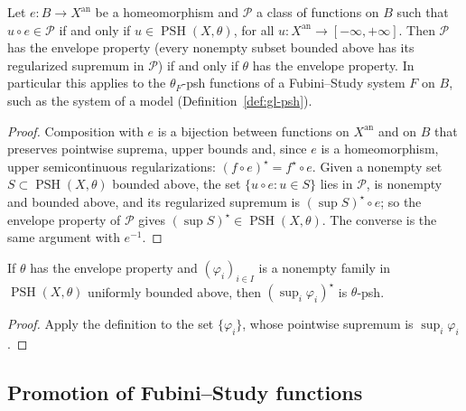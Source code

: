 \begin{lemma}
\label{lem:var-ep-transport}
\leanok
{}
Let $e:B\to X^{\mathrm{an}}$ be a homeomorphism and $\mathcal P$ a class of functions on $B$
such that $u\circ e\in\mathcal P$ if and only if $u\in\operatorname{PSH}(X,\theta)$, for all
$u:X^{\mathrm{an}}\to[-\infty,+\infty]$. Then $\mathcal P$ has the envelope property (every
nonempty subset bounded above has its regularized supremum in $\mathcal P$) if and only if
$\theta$ has the envelope property. In particular this applies to the $\theta_F$-psh functions
of a Fubini--Study system $F$ on $B$, such as the system of a model
(Definition~\ref{def:gl-psh}).
\end{lemma}
\begin{proof}
Composition with $e$ is a bijection between functions on $X^{\mathrm{an}}$ and on $B$ that
preserves pointwise suprema, upper bounds and, since $e$ is a homeomorphism, upper
semicontinuous regularizations: $(f\circ e)^\star=f^\star\circ e$. Given a nonempty set
$S\subset\operatorname{PSH}(X,\theta)$ bounded above, the set $\{u\circ e:u\in S\}$ lies in
$\mathcal P$, is nonempty and bounded above, and its regularized supremum is
$(\sup S)^\star\circ e$; so the envelope property of $\mathcal P$ gives
$(\sup S)^\star\in\operatorname{PSH}(X,\theta)$. The converse is the same argument with
$e^{-1}$.
\end{proof}

\begin{lemma}
\label{lem:var-ep-family}
\leanok
{}
If $\theta$ has the envelope property and $(\varphi_i)_{i\in I}$ is a nonempty family in
$\operatorname{PSH}(X,\theta)$ uniformly bounded above, then $(\sup_i\varphi_i)^\star$ is
$\theta$-psh.
\end{lemma}
\begin{proof}
Apply the definition to the set $\{\varphi_i\}$, whose pointwise supremum is
$\sup_i\varphi_i$.
\end{proof}

\subsection{Promotion of Fubini--Study functions}

